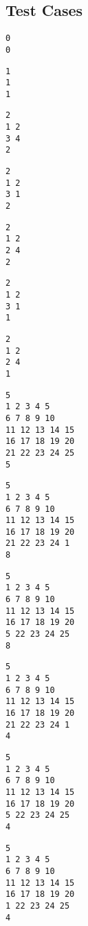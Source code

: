 \subsection{Test Cases}
\begin{lstlisting}[title={<duplicate0.txt 7>}, label=Listing7]
0
0
\end{lstlisting}
\begin{lstlisting}[title={<duplicate1.txt 8>}, label=Listing8]
1
1
1
\end{lstlisting}
\begin{lstlisting}[title={<duplicate2-0.txt 9>}, label=Listing9]
2
1 2
3 4
2
\end{lstlisting}
\begin{lstlisting}[title={<duplicate2-1.txt 10>}, label=Listing10]
2
1 2
3 1
2
\end{lstlisting}
\begin{lstlisting}[title={<duplicate2-2.txt 11>}, label=Listing11]
2
1 2
2 4
2
\end{lstlisting}\begin{lstlisting}[title={<duplicate2-3.txt 12>}, label=Listing12]
2
1 2
3 1
1
\end{lstlisting}
\begin{lstlisting}[title={<duplicate2-4.txt 13>}, label=Listing13]
2
1 2
2 4
1
\end{lstlisting}
\begin{lstlisting}[title={<duplicate5-0.txt 14>}, label=Listing14]
5
1 2 3 4 5
6 7 8 9 10
11 12 13 14 15
16 17 18 19 20
21 22 23 24 25
5
\end{lstlisting}
\begin{lstlisting}[title={<duplicate5-1.txt 15>}, label=Listing15]
5
1 2 3 4 5
6 7 8 9 10
11 12 13 14 15
16 17 18 19 20
21 22 23 24 1
8
\end{lstlisting}
\begin{lstlisting}[title={<duplicate5-2.txt 16>}, label=Listing16]
5
1 2 3 4 5
6 7 8 9 10
11 12 13 14 15
16 17 18 19 20
5 22 23 24 25
8
\end{lstlisting}
\begin{lstlisting}[title={<duplicate5-3.txt 17>}, label=Listing17]
5
1 2 3 4 5
6 7 8 9 10
11 12 13 14 15
16 17 18 19 20
21 22 23 24 1
4
\end{lstlisting}
\begin{lstlisting}[title={<duplicate5-4.txt 18>}, label=Listing18]
5
1 2 3 4 5
6 7 8 9 10
11 12 13 14 15
16 17 18 19 20
5 22 23 24 25
4
\end{lstlisting}
\begin{lstlisting}[title={<duplicate5-5.txt 19>}, label=Listing19]
5
1 2 3 4 5
6 7 8 9 10
11 12 13 14 15
16 17 18 19 20
1 22 23 24 25
4
\end{lstlisting}
